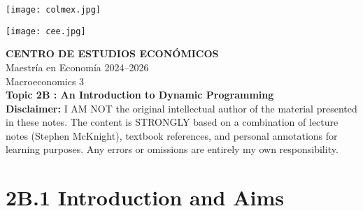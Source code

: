 \documentclass[12pt]{article}
\title{}
\author{}
\date{}
\begin{document}
\begin{titlepage}
    \vspace*{-1cm}
    \noindent
    \begin{minipage}[t]{0.49\textwidth}
        \texttt{[image: colmex.jpg]}
    \end{minipage}%
    \begin{minipage}[t]{0.49\textwidth}
        \raggedleft
        \texttt{[image: cee.jpg]}
    \end{minipage}

    \vspace*{2cm}

    \begin{center}
        \Huge \textbf{CENTRO DE ESTUDIOS ECONÓMICOS} \\[1.5em]
        \Large Maestría en Economía 2024--2026 \\[2em]
        \Large Macroeconomics 3 \\[3em]
        \LARGE \textbf{Topic 2B : An Introduction to Dynamic
Programming} \\[6em]
        \large \textbf{Disclaimer:} I AM NOT the original intellectual author of the material presented in these notes. The content is STRONGLY based on a combination of lecture notes (Stephen McKnight), textbook references, and personal annotations for learning purposes. Any errors or omissions are entirely my own responsibility.\\[0.9em]
        
    \end{center}

    \vfill
\end{titlepage}

\newpage

\setcounter{secnumdepth}{2}
\setcounter{tocdepth}{3}
\tableofcontents

\newpage

\section*{\noindent\textbf{2B.1 Introduction and Aims}}
\end{document}
